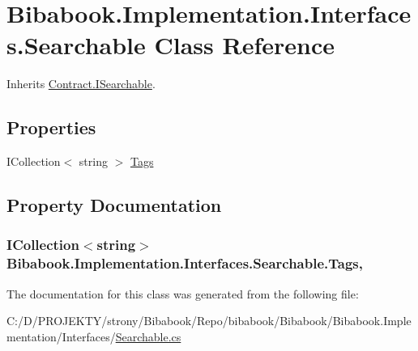 \hypertarget{class_bibabook_1_1_implementation_1_1_interfaces_1_1_searchable}{}\section{Bibabook.\+Implementation.\+Interfaces.\+Searchable Class Reference}
\label{class_bibabook_1_1_implementation_1_1_interfaces_1_1_searchable}


Inherits \hyperlink{interface_contract_1_1_i_searchable}{Contract.\+I\+Searchable}.

\subsection*{Properties}
\begin{DoxyCompactItemize}
\item 
I\+Collection$<$ string $>$ \hyperlink{class_bibabook_1_1_implementation_1_1_interfaces_1_1_searchable_a8cd0c009e3fb0607c0c736d74cd9dbb8}{Tags}
\end{DoxyCompactItemize}


\subsection{Property Documentation}
\hypertarget{class_bibabook_1_1_implementation_1_1_interfaces_1_1_searchable_a8cd0c009e3fb0607c0c736d74cd9dbb8}{}
\subsubsection[{Tags}]{\setlength{\rightskip}{0pt plus 5cm}I\+Collection$<$string$>$ Bibabook.\+Implementation.\+Interfaces.\+Searchable.\+Tags\hspace{0.3cm}{\ttfamily [get]}, {\ttfamily [set]}}\label{class_bibabook_1_1_implementation_1_1_interfaces_1_1_searchable_a8cd0c009e3fb0607c0c736d74cd9dbb8}


The documentation for this class was generated from the following file\+:\begin{DoxyCompactItemize}
\item 
C\+:/\+D/\+P\+R\+O\+J\+E\+K\+T\+Y/strony/\+Bibabook/\+Repo/bibabook/\+Bibabook/\+Bibabook.\+Implementation/\+Interfaces/\hyperlink{_searchable_8cs}{Searchable.\+cs}\end{DoxyCompactItemize}
